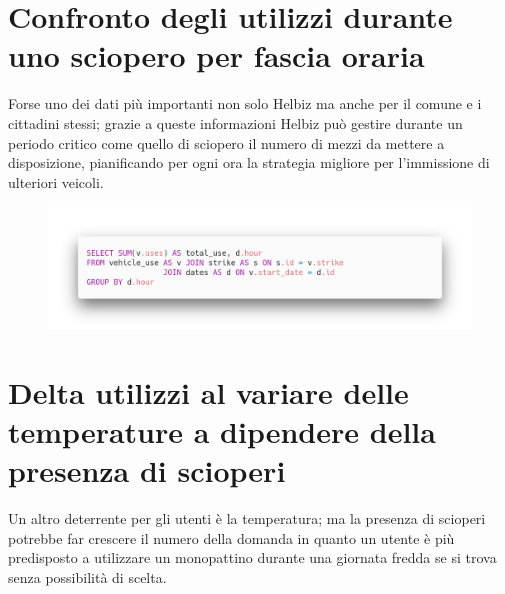 \section{Confronto degli utilizzi durante uno sciopero per fascia oraria}
Forse uno dei dati più importanti non solo Helbiz ma anche per il comune e 
i cittadini stessi; grazie a queste informazioni Helbiz può gestire durante 
un periodo critico come quello di sciopero il numero di mezzi da mettere a disposizione,
pianificando per ogni ora la strategia migliore per l'immissione di ulteriori veicoli.
\begin{figure}[H]                                                                                                                                                            
\centering                                                                                                                                                                   
\includegraphics[width=\textwidth]{images/query3}                                                                                                                                   
\label{fig:query3}                                                                                                                                                           
\end{figure}

\section{Delta utilizzi al variare delle temperature a dipendere della presenza di scioperi}
Un altro deterrente per gli utenti è la temperatura; ma la presenza di scioperi potrebbe
far crescere il numero della domanda in quanto un utente è più predisposto a utilizzare un 
monopattino durante una giornata fredda se si trova senza possibilità di scelta.

